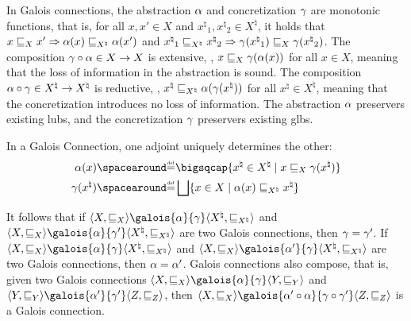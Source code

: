 In Galois connections, the abstraction $\alpha$ and concretization $\gamma$ are monotonic functions, that is, for all $x, x' \in X$ and ${x^\natural}_1, {x^\natural}_2 \in {X^\natural}$, it holds that $x \sqsubseteq_X x' \Rightarrow \alpha(x) \sqsubseteq_{X^\natural} \alpha(x')$ and ${x^\natural}_1 \sqsubseteq_{X^\natural} {x^\natural}_2 \Rightarrow \gamma({x^\natural}_1) \sqsubseteq_X \gamma({x^\natural}_2)$. The composition $\gamma \circ \alpha \in X \to X$ is extensive, \ie, $x \sqsubseteq_X \gamma(\alpha(x))$ for all $x \in X$, meaning that the loss of information in the abstraction is sound. The composition $\alpha \circ \gamma\in {X^\natural} \to {X^\natural}$ is reductive, \ie, ${x^\natural} \sqsubseteq_{X^\natural} \alpha(\gamma({x^\natural}))$ for all ${x^\natural} \in {X^\natural}$, meaning that the concretization introduces no loss of information. The abstraction $\alpha$ preservers existing lubs, and the concretization $\gamma$ preservers existing glbs.

\begin{remark}
  In a Galois Connection, one adjoint uniquely determines the other:
  \begin{align*}
    \abstraction(x) &\DefeQ \bigmeet \setdef{{x^\natural} \in {X^\natural}}{x \sqsubseteq_X \concretization({x^\natural})} \\
    \concretization({x^\natural}) &\DefeQ \bigjoin \setdef{x \in X}{\abstraction(x) \sqsubseteq_{X^\natural} {x^\natural}}
  \end{align*}
\end{remark}


It follows that if $\tuple{X}{\sqsubseteq_X}\galois{\abstraction}{\concretization}\tuple{{X^\natural}}{\sqsubseteq_{X^\natural}}$ and $\tuple{X}{\sqsubseteq_X}\galois{\abstraction}{\concretization'}\tuple{{X^\natural}}{\sqsubseteq_{X^\natural}}$ are two Galois connections, then $\gamma = \gamma'$. If $\tuple{X}{\sqsubseteq_X}\galois{\abstraction}{\concretization}\tuple{{X^\natural}}{\sqsubseteq_{X^\natural}}$ and $\tuple{X}{\sqsubseteq_X}\galois{\abstraction'}{\concretization}\tuple{{X^\natural}}{\sqsubseteq_{X^\natural}}$ are two Galois connections, then $\alpha = \alpha'$.
%
Galois connections also compose, that is, given two Galois connections $\tuple{X}{\sqsubseteq_X}\galois{\abstraction}{\concretization}\tuple{Y}{\sqsubseteq_Y}$ and $\tuple{Y}{\sqsubseteq_Y}\galois{\abstraction'}{\concretization'}\tuple{Z}{\sqsubseteq_Z}$, then $\tuple{X}{\sqsubseteq_X}\galois{\abstraction' \circ \abstraction}{\concretization \circ \concretization'}\tuple{Z}{\sqsubseteq_Z}$ is a Galois connection.


